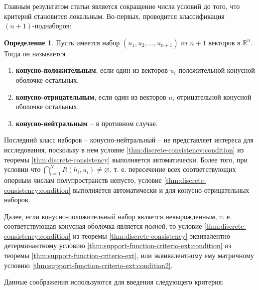 \documentclass[a4paper, 12pt, titlepage]{article}
\theoremstyle{definition}
\newtheorem{SmartDefinition}{Определение}
\theoremstyle{plain}
\theoremstyle{plain}
\begin{document}
Главным результатом статьи является сокращение числа условий до того, что
критерий становится локальным. Во-первых, проводится классификация $(n +
1)$-поднаборов:

\begin{SmartDefinition}
 \label{def:tuples-classifiction}
 Пусть имеется набор $(u_{1}, u_{2}, \ldots, u_{n + 1})$ из $n + 1$ векторов в
 $\mathbb{R}^{n}$. Тогда он называется
 \begin{enumerate}
  \item \textbf{конусно-положительным}, если один из векторов $u_{i}$
  положительной конусной оболочке остальных.
  \item \textbf{конусно-отрицательным}, если один из векторов $u_{i}$
  отрицательной конусной оболочке остальных.
  \item \textbf{конусно-нейтральным} -- в противном случае.
 \end{enumerate}
\end{SmartDefinition}

Последний класс наборов -- конусно-нейтральный -- не представляет интереса для
исследования, поскольку в нем условие \ref{thm:discrete-consistency:condition}
из теоремы \ref{thm:discrete-consistency} выполняется автоматически. Более
того, при условии что
$\bigcap \limits_{i = 1}^{N} R(h_{i}, u_{i}) \neq \varnothing$,
т. е. пересечение всех соответствующих опорным числам полупространств непусто,
условие \ref{thm:discrete-consistency:condition} выполняется автоматически и
для конусно-отрицательных наборов.

Далее, если конусно-положительный набор является невырожденным, т. е.
соответствующая конусная оболочка является \textit{полной}, то условие
\ref{thm:discrete-consistency:condition} из теоремы
\ref{thm:discrete-consistency} эквивалентно детерминантному условию
\ref{thm:support-function-criterio-ext:condition} из теоремы
\ref{thm:support-function-criterio-ext}, или эквивалентному ему матричному
условию \ref{thm:support-function-criterio-ext:condition2}.

Данные соображения используются для введения следующего критерия:
\end{document}
